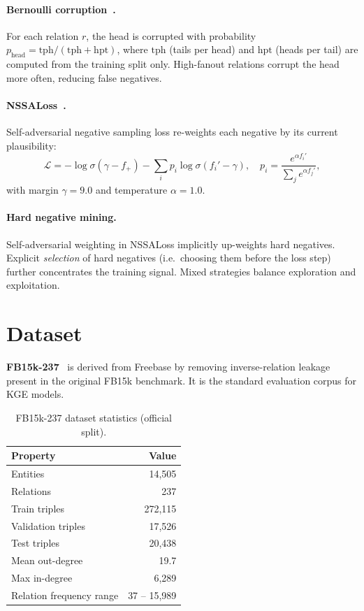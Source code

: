 \documentclass[10pt,twocolumn,letterpaper]{article}
\begin{document}
\paragraph{Bernoulli corruption~\cite{wang2014knowledge}.}
For each relation $r$, the head is corrupted with probability
$p_{\mathrm{head}} = \mathrm{tph}/(\mathrm{tph}+\mathrm{hpt})$,
where $\mathrm{tph}$ (tails per head) and $\mathrm{hpt}$ (heads per tail)
are computed from the training split only.
High-fanout relations corrupt the head more often, reducing false negatives.

\paragraph{NSSALoss~\cite{sun2019rotate}.}
Self-adversarial negative sampling loss re-weights each negative by its
current plausibility:
\begin{equation}
\mathcal{L} = -\log\sigma(\gamma - f_+)
             - \textstyle\sum_i p_i \log\sigma(f_i' - \gamma),
\quad
p_i = \frac{e^{\alpha f_i'}}{\sum_j e^{\alpha f_j'}},
\label{eq:nssa}
\end{equation}
with margin $\gamma=9.0$ and temperature $\alpha=1.0$.

\paragraph{Hard negative mining.}
Self-adversarial weighting in NSSALoss implicitly up-weights hard negatives.
Explicit \emph{selection} of hard negatives (i.e.\ choosing them before the
loss step) further concentrates the training signal. Mixed
strategies balance exploration and exploitation.

\section{Dataset}
\label{sec:dataset}

\textbf{FB15k-237}~\cite{toutanova2015observed} is derived from Freebase by removing
inverse-relation leakage present in the original FB15k benchmark.
It is the standard evaluation corpus for KGE models.

\begin{table}[ht]
\centering\small
\caption{FB15k-237 dataset statistics (official split).}
\label{tab:dataset}
\begin{tabular}{@{}lr@{}}
\toprule
Property & Value \\
\midrule
Entities & 14,505 \\
Relations & 237 \\
Train triples & 272,115 \\
Validation triples & 17,526 \\
Test triples & 20,438 \\
Mean out-degree & 19.7 \\
Max in-degree & 6,289 \\
Relation frequency range & 37 -- 15,989 \\
\bottomrule
\end{tabular}
\end{table}
\end{document}
